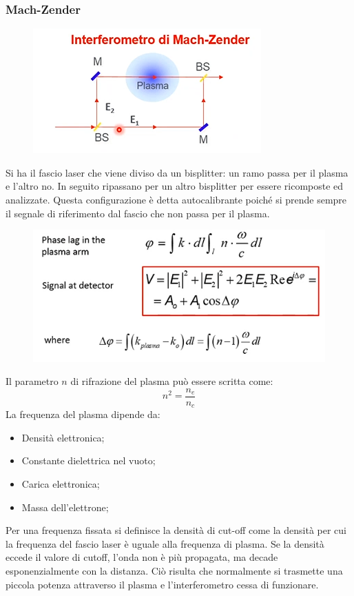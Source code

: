 \documentclass{article}
\begin{document}
\subsubsection{Mach-Zender}
 \begin{figure}
     \includegraphics[scale=0.4]{2022-05-29-16-10-11.png}%
 \end{figure}
 Si ha il fascio laser che viene diviso da un bisplitter: un ramo passa per il plasma e l'altro no. In seguito ripassano per un altro bisplitter per essere ricomposte ed analizzate. Questa configurazione è detta autocalibrante poiché si prende sempre il segnale di riferimento dal fascio che non passa per il plasma.
 \begin{figure}
     \includegraphics[scale=0.4]{2022-05-29-16-13-05.png}%
 \end{figure}
 Il parametro \(n\) di rifrazione del plasma può essere scritta come:\begin{equation}
     n^{2}=\frac{n_{e}}{n_{c}}
 \end{equation}
 La frequenza del plasma dipende da:\begin{itemize}
     \item Densità elettronica;
     \item Constante dielettrica nel vuoto;
     \item Carica elettronica;
     \item Massa dell'elettrone;
 \end{itemize}
 Per una frequenza fissata si definisce la densità di cut-off come la densità per cui la frequenza del fascio laser è uguale alla frequenza di plasma. Se la densità eccede il valore di cutoff, l'onda non è più propagata, ma decade esponenzialmente con la distanza. Ciò risulta che normalmente si trasmette una piccola potenza attraverso il plasma e l'interferometro cessa di funzionare.
\end{document}
